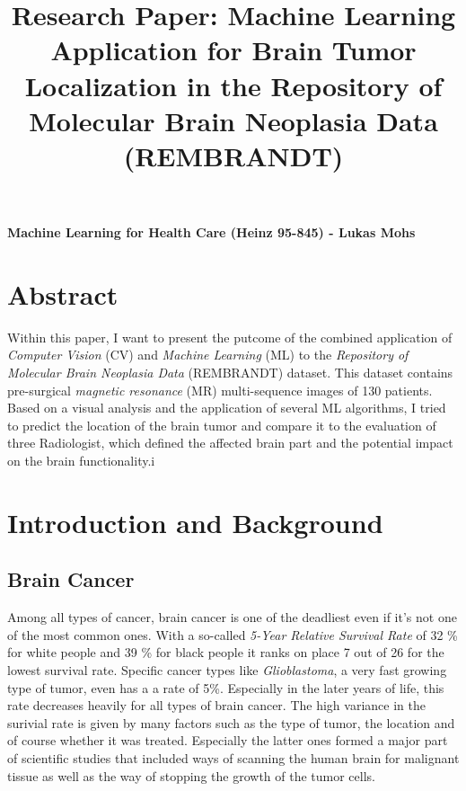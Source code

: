 \documentclass[twoside,11pt]{article}
\begin{document}
\title{Research Paper: Machine Learning Application for Brain Tumor Localization in the  Repository of Molecular Brain Neoplasia Data (REMBRANDT) }

\maketitle
\textbf{Machine Learning for Health Care (Heinz 95-845) - Lukas Mohs}


\section{Abstract}
\noindent Within this paper, I want to present the putcome of the  combined application of \textit{Computer Vision} (CV) and  \textit{Machine Learning} (ML) to the \textit{Repository of Molecular Brain Neoplasia Data } (REMBRANDT) dataset. This dataset contains pre-surgical \textit{magnetic resonance} (MR) multi-sequence images of 130 patients. Based on a visual analysis and the application of several ML algorithms, I tried to predict the location of the brain tumor and compare it to the evaluation of three Radiologist, which defined the affected brain part and the potential impact on the brain functionality.i

\section{Introduction and Background}
\subsection{Brain Cancer}
Among all types of cancer, brain cancer is one of the deadliest even if it's not one of the most common ones. With a so-called \textit{5-Year Relative Survival Rate} of 32 \% for white people and 39 \% for black people it ranks on place 7 out of 26 for the lowest survival rate. Specific cancer types like \textit{Glioblastoma}, a very fast growing type of tumor, even has a a rate of 5\%. Especially in the later years of life, this rate decreases heavily for all types of brain cancer. \citep{cite1}
The high variance in the surivial rate is given by many factors such as the type of tumor, the location and of course whether it was treated. Especially the latter ones formed a major part of scientific studies that included ways of scanning the human brain for malignant tissue as well as the way of stopping the growth of the tumor cells. \citep{cite2}
\end{document}
